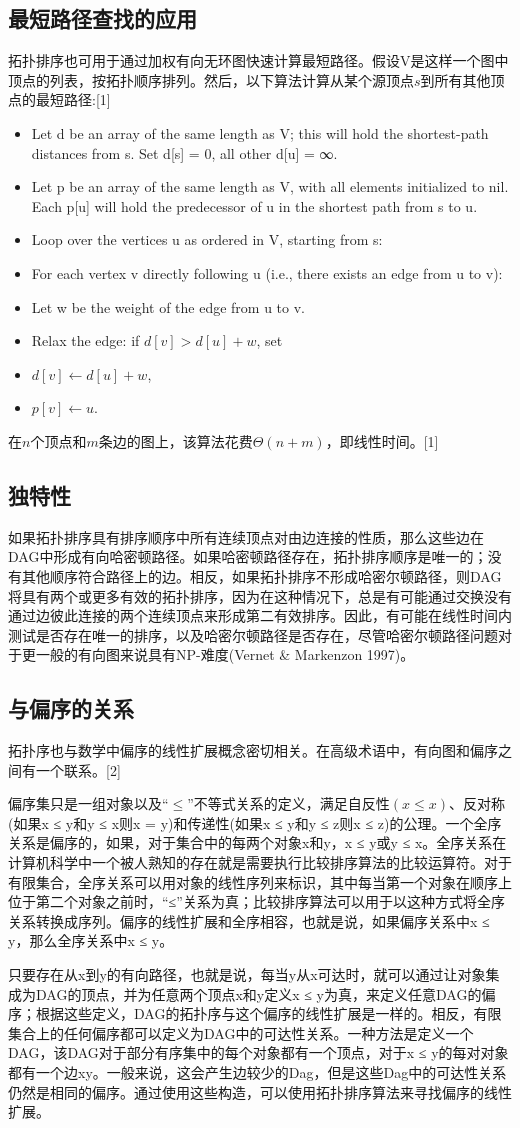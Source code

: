 \subsection{最短路径查找的应用}
拓扑排序也可用于通过加权有向无环图快速计算最短路径。假设V是这样一个图中顶点的列表，按拓扑顺序排列。然后，以下算法计算从某个源顶点$s$到所有其他顶点的最短路径:[1]
\begin{itemize}
\item Let d be an array of the same length as V; this will hold the shortest-path distances from s. Set d[s] = 0, all other d[u] = ∞.
\item Let p be an array of the same length as V, with all elements initialized to nil. Each p[u] will hold the predecessor of u in the shortest path from s to u.
\item Loop over the vertices u as ordered in V, starting from s:
\item For each vertex v directly following u (i.e., there exists an edge from u to v):
\item Let w be the weight of the edge from u to v.
\item Relax the edge: if $d[v] > d[u] + w$, set
\item $d[v] \longleftarrow d[u] + w$,
\item $p[v] \longleftarrow u$.
\end{itemize}
在$n$个顶点和$m$条边的图上，该算法花费$\Theta(n + m)$，即线性时间。[1]

\subsection{独特性}
如果拓扑排序具有排序顺序中所有连续顶点对由边连接的性质，那么这些边在DAG中形成有向哈密顿路径。如果哈密顿路径存在，拓扑排序顺序是唯一的；没有其他顺序符合路径上的边。相反，如果拓扑排序不形成哈密尔顿路径，则DAG将具有两个或更多有效的拓扑排序，因为在这种情况下，总是有可能通过交换没有通过边彼此连接的两个连续顶点来形成第二有效排序。因此，有可能在线性时间内测试是否存在唯一的排序，以及哈密尔顿路径是否存在，尽管哈密尔顿路径问题对于更一般的有向图来说具有NP-难度(Vernet & Markenzon 1997)。

\subsection{与偏序的关系}
拓扑序也与数学中偏序的线性扩展概念密切相关。在高级术语中，有向图和偏序之间有一个联系。[2]

偏序集只是一组对象以及“$\leq$”不等式关系的定义，满足自反性$(x\leq x)$、反对称(如果x ≤ y和y ≤ x则x = y)和传递性(如果x ≤ y和y ≤ z则x ≤ z)的公理。一个全序关系是偏序的，如果，对于集合中的每两个对象x和y，x ≤ y或y ≤ x。全序关系在计算机科学中一个被人熟知的存在就是需要执行比较排序算法的比较运算符。对于有限集合，全序关系可以用对象的线性序列来标识，其中每当第一个对象在顺序上位于第二个对象之前时，“≤”关系为真；比较排序算法可以用于以这种方式将全序关系转换成序列。偏序的线性扩展和全序相容，也就是说，如果偏序关系中x ≤ y，那么全序关系中x ≤ y。

只要存在从x到y的有向路径，也就是说，每当y从x可达时，就可以通过让对象集成为DAG的顶点，并为任意两个顶点x和y定义x ≤ y为真，来定义任意DAG的偏序；根据这些定义，DAG的拓扑序与这个偏序的线性扩展是一样的。相反，有限集合上的任何偏序都可以定义为DAG中的可达性关系。一种方法是定义一个DAG，该DAG对于部分有序集中的每个对象都有一个顶点，对于x ≤ y的每对对象都有一个边xy。一般来说，这会产生边较少的Dag，但是这些Dag中的可达性关系仍然是相同的偏序。通过使用这些构造，可以使用拓扑排序算法来寻找偏序的线性扩展。